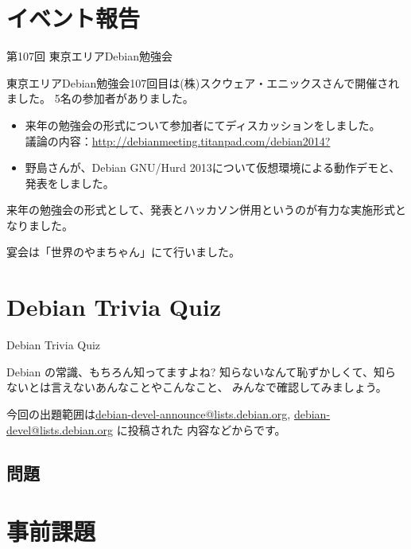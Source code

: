 \section{イベント報告}

\begin{frame}{第107回 東京エリアDebian勉強会}

 東京エリアDebian勉強会107回目は(株)スクウェア・エニックスさんで開催されました。
5名の参加者がありました。

\begin{itemize}
\item 来年の勉強会の形式について参加者にてディスカッションをしました。\\
議論の内容：\url{http://debianmeeting.titanpad.com/debian2014?}
\item 野島さんが、Debian GNU/Hurd 2013について仮想環境による動作デモと、発表をしました。
\end{itemize}

 来年の勉強会の形式として、発表とハッカソン併用というのが有力な実施形式となりました。

 宴会は「世界のやまちゃん」にて行いました。


\end{frame}

\section{Debian Trivia Quiz}
\begin{frame}{Debian Trivia Quiz}

  Debian の常識、もちろん知ってますよね?
知らないなんて恥ずかしくて、知らないとは言えないあんなことやこんなこと、
みんなで確認してみましょう。

今回の出題範囲は\url{debian-devel-announce@lists.debian.org},
\url{debian-devel@lists.debian.org} に投稿された
内容などからです。

\end{frame}

\subsection{問題}
 

\section{事前課題}
{\footnotesize
 
}



